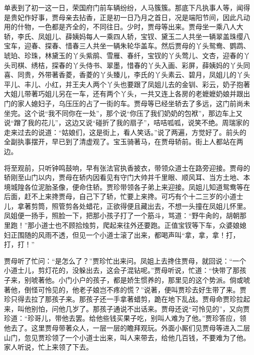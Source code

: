 \begin{parag}


    单表到了初一这一日，荣国府门前车辆纷纷，人马簇簇。那底下凡执事人等，闻得是贵妃作好事，贾母亲去拈香，正是初一日乃月之首日，况是端阳节间，因此凡动用的什物，一色都是齐全的，不同往日。少时，贾母等出来。贾母坐一乘八人大轿，李氏、凤姐儿、薛姨妈每人一乘四人轿，宝钗、黛玉二人共坐一辆翠盖珠缨八宝车，迎春、探春、惜春三人共坐一辆朱轮华盖车。然后贾母的丫头鸳鸯、鹦鹉、琥珀、珍珠，林黛玉的丫头紫鹃、雪雁、春纤，宝钗的丫头莺儿、文杏，迎春的丫头司棋、绣桔，探春的丫头侍书、翠墨，惜春的丫头入画、彩屏，薛姨妈的丫头同喜、同贵，外带著香菱，香菱的丫头臻儿，李氏的丫头素云、碧月，凤姐儿的丫头平儿、丰儿、小红，并王夫人两个丫头也要跟了凤姐儿去的金钏、彩云，奶子抱著大姐儿带著巧姐儿另在一车，还有两个丫头，一共又连上各房的老嬷嬷奶娘并跟出门的家人媳妇子，乌压压的占了一街的车。贾母等已经坐轿去了多远，这门前尚未坐完。这个说“我不同你在一处”，那个说“你压了我们奶奶的包袱”，那边车上又说“蹭了我的花儿”，这边又说“碰折了我的扇子”，咭咭呱呱，说笑不绝。周瑞家的走来过去的说道：“姑娘们，这是街上，看人笑话。”说了两遍，方觉好了。前头的全副执事摆开，早已到了清虚观了。宝玉骑著马，在贾母轿前。街上人都站在两边。
\end{parag}


\begin{parag}


    将至观前，只听钟鸣鼓响，早有张法官执香披衣，带领众道士在路旁迎接。贾母的轿刚至山门以内，贾母在轿内因看见有守门大帅并千里眼、顺风耳、当方土地、本境城隍各位泥胎圣像，便命住轿。贾珍带领各子弟上来迎接。凤姐儿知道鸳鸯等在后面，赶不上来搀贾母，自己下了轿，忙要上来搀。可巧有个十二三岁的小道士儿，拿著剪筒，照管剪各处蜡花，正欲得便且藏出去，不想一头撞在凤姐儿怀里。凤姐便一扬手，照脸一下，把那小孩子打了一个筋斗，骂道：“野牛肏的，胡朝那里跑！”那小道士也不顾拾烛剪，爬起来往外还要跑。正值宝钗等下车，众婆娘媳妇正围随的风雨不透，但见一个小道士滚了出来，都喝声叫“拿，拿，拿！打，打，打！”
\end{parag}


\begin{parag}


    贾母听了忙问：“是怎么了？”贾珍忙出来问。凤姐上去搀住贾母，就回说：“一个小道士儿，剪灯花的，没躲出去，这会子混钻呢。”贾母听说，忙道：“快带了那孩子来，别唬著他。小门小户的孩子，都是娇生惯养的，那里见的这个势派。倘或唬著他，倒怪可怜见的，他老子娘岂不疼的慌？”说著，便叫贾珍去好生带了来。贾珍只得去拉了那孩子来。那孩子还一手拿著蜡剪，跪在地下乱战。贾母命贾珍拉起来，叫他别怕，问他几岁了。那孩子通说不出话来。贾母还说“可怜见的”，又向贾珍道：“珍哥儿，带他去罢。给他些钱买果子吃，别叫人难为了他。”贾珍答应，领他去了。这里贾母带著众人，一层一层的瞻拜观玩。外面小厮们见贾母等进入二层山门，忽见贾珍领了一个小道士出来，叫人来带去，给他几百钱，不要难为了他。家人听说，忙上来领了下去。
\end{parag}


